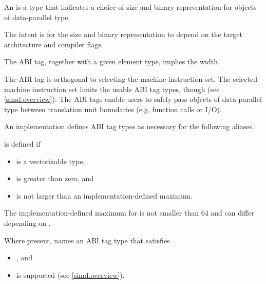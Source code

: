 \pnum\label{wording.ABI.tag}
An  is a type that indicates a choice of size and binary
representation for objects of data-parallel type.
\begin{note}
  The intent is for the size and binary representation to depend on the target
  architecture and compiler flags.
\end{note}
The ABI tag, together with a given element type, implies the width.

\pnum
\begin{note}
The ABI tag is orthogonal to selecting the machine instruction set.
The selected machine instruction set limits the usable ABI tag types, though
(see \ref{simd.overview}).
The ABI tags enable users to safely pass objects of data-parallel type between
translation unit boundaries (e.g. function calls or I/O).
\end{note}

\pnum
An implementation defines ABI tag types as necessary for the following aliases.

\pnum\label{wording.deducet}
 is defined if
\begin{itemize}
  \item {} is a vectorizable type,
  \item {} is greater than zero, and
  \item {} is not larger than an implementation-defined maximum.
\end{itemize}
The implementation-defined maximum for  is not smaller than 64
and can differ depending on .

\pnum
Where present,  names an ABI tag type that satisfies
\begin{itemize}
  \item {}, and
  \item {} is supported (see \ref{simd.overview}).
\end{itemize}


